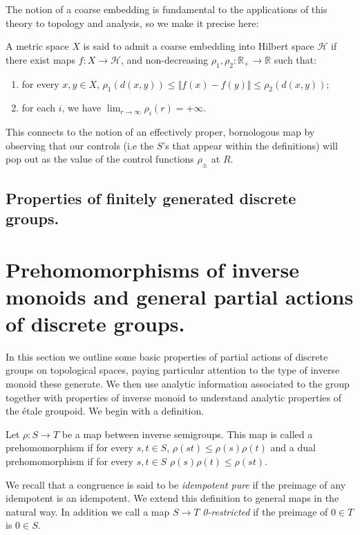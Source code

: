 The notion of a coarse embedding is fundamental to the applications of this theory to topology and analysis, so we make it precise here:

\begin{definition}\label{def:FCE}
A metric space $X$ is said to admit a coarse embedding into Hilbert space $\mathcal{H}$ if there exist maps $f:X \rightarrow \mathcal{H}$,  and non-decreasing $\rho_{1},\rho_{2}:\mathbb{R}_{+} \rightarrow \mathbb{R}$ such that:
\begin{enumerate}
\item for every $x,y \in X$, $\rho_{1}(d(x,y)) \leq \Vert f(x) - f(y) \Vert \leq \rho_{2}(d(x,y))$;
\item for each $i$, we have $\lim_{r \rightarrow \infty}\rho_{i}(r) = +\infty$.
\end{enumerate}
\end{definition}

This connects to the notion of an effectively proper, bornologous map by observing that our controls (i.e the $S$'s that appear within the definitions) will pop out as the value of the control functions $\rho_{\pm}$ at $R$.

\subsection{Properties of finitely generated discrete groups.}

\section{Prehomomorphisms of inverse monoids and general partial actions of discrete groups.}\label{Sect:S3} 
In this section we outline some basic properties of partial actions of discrete groups on topological spaces, paying particular attention to the type of inverse monoid these generate. We then use analytic information associated to the group together with properties of inverse monoid to understand analytic properties of the \'etale groupoid. We begin with a definition.

\begin{definition}
Let $\rho: S \rightarrow T$ be a map between inverse semigroups. This map is called a prehomomorphism if for every $s,t \in S$, $\rho(st) \leq \rho(s)\rho(t)$ and a dual prehomomorphism if for every $s,t \in S$ $\rho(s)\rho(t) \leq \rho(st)$.
\end{definition}

We recall that a congruence is said to be \textit{idempotent pure} if the preimage of any idempotent is an idempotent. We extend this definition to general maps in the natural way. In addition we call a map $S \rightarrow T$ \textit{0-restricted} if the preimage of $0 \in T$ is $0 \in S$.

